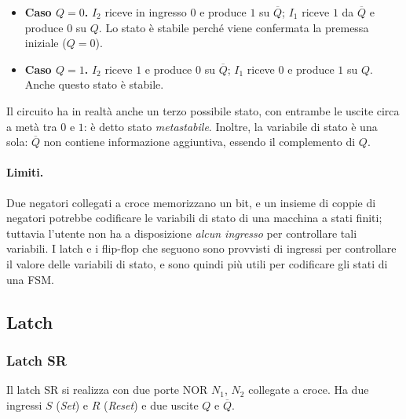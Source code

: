 \documentclass[11pt,a4paper]{article}
\begin{document}
\begin{itemize}
  \item \textbf{Caso $Q = 0$.} $I_2$ riceve in ingresso $0$ e produce $1$ su $\overline{Q}$; $I_1$ riceve $1$ da $\overline{Q}$ e produce $0$ su $Q$. Lo stato è stabile perché viene confermata la premessa iniziale ($Q = 0$).
  \item \textbf{Caso $Q = 1$.} $I_2$ riceve $1$ e produce $0$ su $\overline{Q}$; $I_1$ riceve $0$ e produce $1$ su $Q$. Anche questo stato è stabile.
\end{itemize}

\begin{osservazione}
Il circuito ha in realtà anche un terzo possibile stato, con entrambe le uscite circa a metà tra $0$ e $1$: è detto stato \emph{metastabile}. Inoltre, la variabile di stato è una sola: $\overline{Q}$ non contiene informazione aggiuntiva, essendo il complemento di $Q$.
\end{osservazione}

\paragraph{Limiti.} Due negatori collegati a croce memorizzano un bit, e un insieme di coppie di negatori potrebbe codificare le variabili di stato di una macchina a stati finiti; tuttavia l'utente non ha a disposizione \emph{alcun ingresso} per controllare tali variabili. I latch e i flip-flop che seguono sono provvisti di ingressi per controllare il valore delle variabili di stato, e sono quindi più utili per codificare gli stati di una FSM.

\subsection{Latch}

\subsubsection{Latch SR}

Il latch SR si realizza con due porte NOR $N_1$, $N_2$ collegate a croce. Ha due ingressi $S$ (\emph{Set}) e $R$ (\emph{Reset}) e due uscite $Q$ e $\overline{Q}$.

\begin{center}
\end{center}
\end{document}
